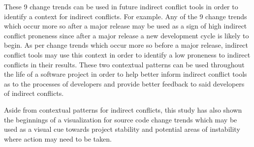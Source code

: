 These 9 change trends can be used in future indirect conflict tools in order to identify a context for indirect conflicts.
For example. Any of the 9 change trends which occur more so after a major release may be used as a sign of high indirect conflict proneness
since after a major release a new development cycle is likely to begin. As per change trends which occur more so before a major release, indirect
conflict tools may use this context in order to identify a low proneness to indirect conflicts in their results. These two contextual patterns
can be used throughout the life of a software project in order to help better inform indirect conflict tools as to the processes of developers
and provide better feedback to said developers of indirect conflicts.

Aside from contextual patterns for indirect conflicts, this study has also shown the beginnings of a visualization for source code change trends which may
be used as a visual cue towards project stability and potential areas of instability where action may need to be taken.